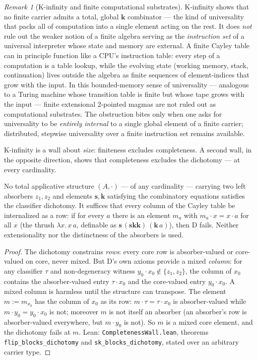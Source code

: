 \documentclass[sigconf,screen]{acmart}
\newcommand{\dotop}{\cdot}
\theoremstyle{remark}
\newtheorem{remark}{Remark}
\begin{document}
\begin{remark}[K-infinity and finite computational substrates]
K-infinity shows that no finite carrier admits a total, global $\mathbf{k}$ combinator --- the kind of universality that packs all of computation into a single element acting on the rest. It does \emph{not} rule out the weaker notion of a finite algebra serving as the \emph{instruction set} of a universal interpreter whose state and memory are external. A finite Cayley table can in principle function like a CPU's instruction table: every step of a computation is a table lookup, while the evolving state (working memory, stack, continuation) lives outside the algebra as finite sequences of element-indices that grow with the input. In this bounded-memory sense of universality --- analogous to a Turing machine whose transition table is finite but whose tape grows with the input --- finite extensional 2-pointed magmas are not ruled out as computational substrates. The obstruction bites only when one asks for universality to be \emph{entirely internal} to a single global element of a finite carrier; distributed, stepwise universality over a finite instruction set remains available.
\end{remark}

K-infinity is a wall about \emph{size}: finiteness excludes completeness. A second wall, in the opposite direction, shows that completeness excludes the dichotomy --- at every cardinality.

\begin{theorem}
\label{thm:completeness-wall}
No total applicative structure $(A, \dotop)$ --- of any cardinality --- carrying two left absorbers $z_1, z_2$ and elements $\mathbf{s}, \mathbf{k}$ satisfying the combinatory equations satisfies the classifier dichotomy. It suffices that every column of the Cayley table be internalized as a row: if for every $a$ there is an element $m_a$ with $m_a \dotop x = x \dotop a$ for all $x$ (the thrush $\lambda x.\, x\, a$, definable as $\mathbf{s}\,(\mathbf{s}\mathbf{k}\mathbf{k})\,(\mathbf{k}\,a)$), then D fails. Neither extensionality nor the distinctness of the absorbers is used.
\end{theorem}

\begin{proof}
The dichotomy constrains \emph{rows}: every core row is absorber-valued or core-valued on core, never mixed. But D's own axioms provide a mixed \emph{column}: for any classifier $\tau$ and non-degeneracy witness $y_0 \dotop x_0 \notin \{z_1, z_2\}$, the column of $x_0$ contains the absorber-valued entry $\tau \dotop x_0$ and the core-valued entry $y_0 \dotop x_0$. A mixed column is harmless until the structure can transpose. The element $m := m_{x_0}$ has the column of $x_0$ as its row: $m \dotop \tau = \tau \dotop x_0$ is absorber-valued while $m \dotop y_0 = y_0 \dotop x_0$ is not; moreover $m$ is not itself an absorber (an absorber's row is absorber-valued everywhere, but $m \dotop y_0$ is not). So $m$ is a mixed core element, and the dichotomy fails at $m$. Lean: \texttt{CompletenessWall.lean}, theorems \texttt{flip\_blocks\_dichotomy} and \texttt{sk\_blocks\_dichotomy}, stated over an arbitrary carrier type.
\end{proof}
\end{document}
